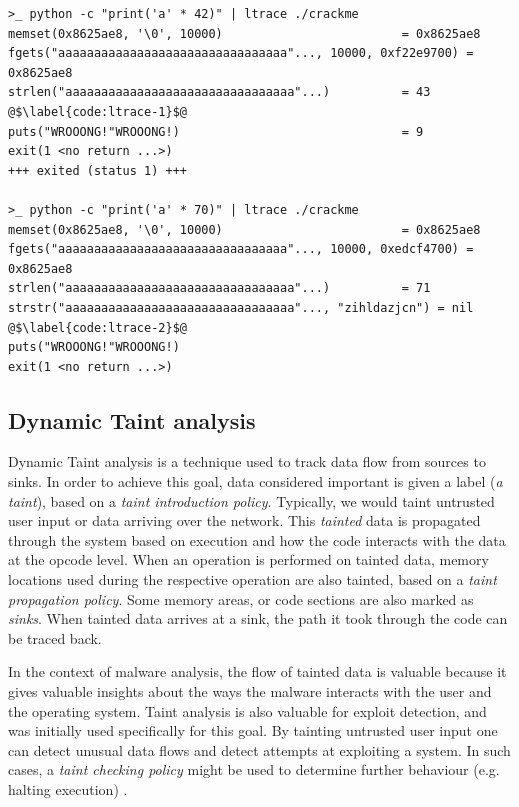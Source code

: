 
\begin{lstlisting}[caption={ltrace (``a library call tracer'') output of an obfuscated crackme. One can observe a length check in the first execution, and different output when an input of the expected length is provided.}, label={code:ltrace}]
>_ python -c "print('a' * 42)" | ltrace ./crackme
memset(0x8625ae8, '\0', 10000)                         = 0x8625ae8
fgets("aaaaaaaaaaaaaaaaaaaaaaaaaaaaaaaa"..., 10000, 0xf22e9700) = 0x8625ae8
strlen("aaaaaaaaaaaaaaaaaaaaaaaaaaaaaaaa"...)          = 43 @$\label{code:ltrace-1}$@
puts("WROOONG!"WROOONG!)                               = 9
exit(1 <no return ...>)
+++ exited (status 1) +++

>_ python -c "print('a' * 70)" | ltrace ./crackme
memset(0x8625ae8, '\0', 10000)                         = 0x8625ae8
fgets("aaaaaaaaaaaaaaaaaaaaaaaaaaaaaaaa"..., 10000, 0xedcf4700) = 0x8625ae8
strlen("aaaaaaaaaaaaaaaaaaaaaaaaaaaaaaaa"...)          = 71
strstr("aaaaaaaaaaaaaaaaaaaaaaaaaaaaaaaa"..., "zihldazjcn") = nil @$\label{code:ltrace-2}$@
puts("WROOONG!"WROOONG!)
exit(1 <no return ...>)
\end{lstlisting}

\subsection{Dynamic Taint analysis}

Dynamic Taint analysis is a technique used to track data flow from sources to sinks. In order to achieve this goal, data considered important is given a label (\emph{a taint}), based on a \emph{taint introduction policy}. Typically, we would taint untrusted user input or data arriving over the network. This \emph{tainted} data is propagated through the system based on execution and how the code interacts with the data at the opcode level. When an operation is performed on tainted data, memory locations used during the respective operation are also tainted, based on a \emph{taint propagation policy}. Some memory areas, or code sections are also marked as \emph{sinks}. When tainted data arrives at a sink, the path it took through the code can be traced back. 

In the context of malware analysis, the flow of tainted data is valuable because it gives valuable insights about the ways the malware interacts with the user and the operating system. Taint analysis is also valuable for exploit detection, and was initially used specifically for this goal. By tainting untrusted user input one can detect unusual data flows and detect attempts at exploiting a system. In such cases, a \emph{taint checking policy} might be used to determine further behaviour (e.g. halting execution) \cite{da_survey_2019} \cite{all_about_taint_2010}.

